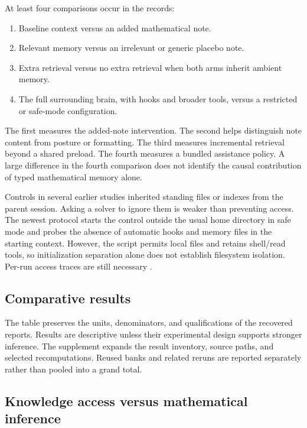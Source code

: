 At least four comparisons occur in the records:

\begin{enumerate}
\item Baseline context versus an added mathematical note.
\item Relevant memory versus an irrelevant or generic placebo note.
\item Extra retrieval versus no extra retrieval when both arms inherit ambient memory.
\item The full surrounding brain, with hooks and broader tools, versus a restricted or safe-mode configuration.
\end{enumerate}

The first measures the added-note intervention. The second helps distinguish note content from posture or formatting. The third measures incremental retrieval beyond a shared preload. The fourth measures a bundled assistance policy. A large difference in the fourth comparison does not identify the causal contribution of typed mathematical memory alone.

Controls in several earlier studies inherited standing files or indexes from the parent session. Asking a solver to ignore them is weaker than preventing access. The newest protocol starts the control outside the usual home directory in safe mode and probes the absence of automatic hooks and memory files in the starting context. However, the script permits local files and retains shell/read tools, so initialization separation alone does not establish filesystem isolation. Per-run access traces are still necessary \citep{ab30prereg,ab30analyze,benchmark_ab30run,benchmark_contamination}.

\subsection{Comparative results}



The table preserves the units, denominators, and qualifications of the recovered reports. Results are descriptive unless their experimental design supports stronger inference. The supplement expands the result inventory, source paths, and selected recomputations. Reused banks and related reruns are reported separately rather than pooled into a grand total.

\subsection{Knowledge access versus mathematical inference}

